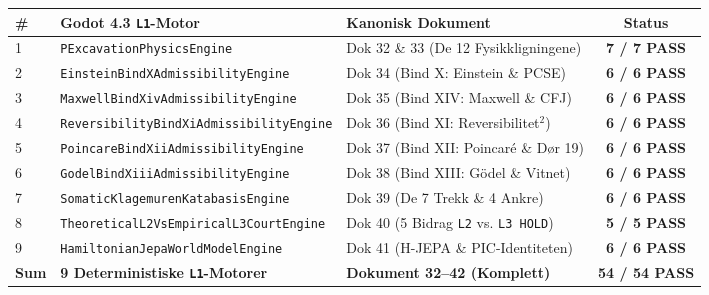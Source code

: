 \documentclass[11pt,a4paper,oneside]{book}
\theoremstyle{definition}
\begin{document}
\begin{center}
\renewcommand{\arraystretch}{1.35}
\begin{tabular}{lllc}
\toprule
\textbf{\#} & \textbf{Godot 4.3 \texttt{L1}-Motor} & \textbf{Kanonisk Dokument} & \textbf{Status} \\
\midrule
1 & \texttt{PExcavationPhysicsEngine} & Dok 32 \& 33 (De 12 Fysikkligningene) & \textcolor{forest}{\textbf{7 / 7 PASS}} \\
2 & \texttt{EinsteinBindXAdmissibilityEngine} & Dok 34 (Bind X: Einstein \& PCSE) & \textcolor{forest}{\textbf{6 / 6 PASS}} \\
3 & \texttt{MaxwellBindXivAdmissibilityEngine} & Dok 35 (Bind XIV: Maxwell \& CFJ) & \textcolor{forest}{\textbf{6 / 6 PASS}} \\
4 & \texttt{ReversibilityBindXiAdmissibilityEngine} & Dok 36 (Bind XI: Reversibilitet$^2$) & \textcolor{forest}{\textbf{6 / 6 PASS}} \\
5 & \texttt{PoincareBindXiiAdmissibilityEngine} & Dok 37 (Bind XII: Poincaré \& Dør 19) & \textcolor{forest}{\textbf{6 / 6 PASS}} \\
6 & \texttt{GodelBindXiiiAdmissibilityEngine} & Dok 38 (Bind XIII: Gödel \& Vitnet) & \textcolor{forest}{\textbf{6 / 6 PASS}} \\
7 & \texttt{SomaticKlagemurenKatabasisEngine} & Dok 39 (De 7 Trekk \& 4 Ankre) & \textcolor{forest}{\textbf{6 / 6 PASS}} \\
8 & \texttt{TheoreticalL2VsEmpiricalL3CourtEngine} & Dok 40 (5 Bidrag \texttt{L2} vs. \texttt{L3 HOLD}) & \textcolor{forest}{\textbf{5 / 5 PASS}} \\
9 & \texttt{HamiltonianJepaWorldModelEngine} & Dok 41 (H-JEPA \& PIC-Identiteten) & \textcolor{forest}{\textbf{6 / 6 PASS}} \\
\midrule
\textbf{Sum} & \textbf{9 Deterministiske \texttt{L1}-Motorer} & \textbf{Dokument 32--42 (Komplett)} & \textcolor{forest}{\textbf{54 / 54 PASS}} \\
\bottomrule
\end{tabular}
\end{center}
\end{document}
